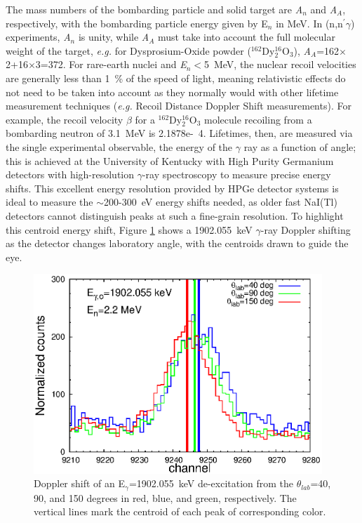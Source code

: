 The mass numbers of the bombarding particle and solid target are \textit{A$_n$} and \textit{A$_A$}, respectively, with the bombarding particle energy given by E$_n$ in MeV. In (n,n$^{\prime}\gamma$) experiments, \textit{A$_n$} is unity, while \textit{A$_A$} must take into account the full molecular weight of the target, \textit{e.g.} for Dysprosium-Oxide powder ($^{162}$Dy$_2^{16}$O$_3$), \textit{A$_A$}=162$\times$2+16$\times$3=372. For rare-earth nuclei and \textit{E$_n$}$<$5~MeV, the nuclear recoil velocities are generally less than 1~\% of the speed of light, meaning relativistic effects do not need to be taken into account as they normally would with other lifetime measurement techniques (\textit{e.g.} Recoil Distance Doppler Shift measurements). For example, the recoil velocity $\beta$ for a $^{162}$Dy$_2^{16}$O$_3$ molecule recoiling from a bombarding neutron of 3.1~MeV is 2.1878e-~4. Lifetimes, then, are measured via the single experimental observable, the energy of the $\gamma$ ray as a function of angle; this is achieved at the University of Kentucky with High Purity Germanium detectors with high-resolution $\gamma$-ray spectroscopy to measure precise energy shifts. This excellent energy resolution provided by HPGe detector systems is ideal to measure the $\sim$200-300~eV energy shifts needed, as older fast NaI(Tl) detectors cannot distinguish peaks at such a fine-grain resolution. To highlight this centroid energy shift, Figure \ref{fig:spectra_shift_DSAM} shows a 1902.055~keV $\gamma$-ray Doppler shifting as the detector changes laboratory angle, with the centroids drawn to guide the eye.

\begin{figure}[h] 
\begin{center}
\includegraphics[width=0.97\textwidth]{figures/spectra_shift_DSAM.eps}
\caption{Doppler shift of an E$_\gamma$=1902.055~keV de-excitation from the $\theta_{lab}$=40, 90, and 150 degrees in red, blue, and green, respectively. The vertical lines mark the centroid of each peak of corresponding color.}
\label{fig:spectra_shift_DSAM}
\end{center}
\end{figure}


